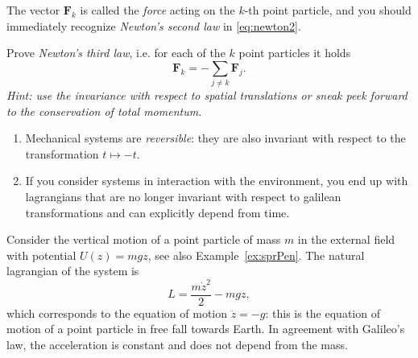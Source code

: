 \documentclass[english,fontsize=11pt,paper=a5,oneside]{scrbook}
\theoremstyle{definition}
\newenvironment{remark}
  {\pushQED{\qed}\renewcommand{\qedsymbol}{$\lozenge$}\remarkx}
  {\popQED\endremarkx}
\newenvironment{example}
  {\pushQED{\qed}\renewcommand{\qedsymbol}{$\lozenge$}\examplex}
  {\popQED\endexamplex}
\newenvironment{exercise}
  {\pushQED{\qed}\renewcommand{\qedsymbol}{$\maltese$}\exercisex}
  {\popQED\endexercisex}
\begin{document}
The vector $\bm{F}_k$ is called the \emph{force} acting on the $k$-th point particle, and you should immediately recognize \emph{Newton's second law} in \eqref{eq:newton2}.

\begin{exercise}\label{ex:N3l1}
    Prove \emph{Newton's third law}, i.e. for each of the $k$ point particles it holds
    \begin{equation}
        \bm{F}_k = -\sum_{j\neq k} \bm{F}_j.
    \end{equation}
    \textit{Hint: use the invariance with respect to spatial translations or sneak peek forward to the conservation of total momentum.}
\end{exercise}

\begin{remark}
\begin{enumerate}
    \item Mechanical systems are \emph{reversible}: they are also invariant with respect to the transformation $t\mapsto -t$.
    \item If you consider systems in interaction with the environment, you end up with lagrangians that are no longer invariant with respect to galilean transformations and can explicitly depend from time.
\end{enumerate}
\end{remark}

\begin{example}
    Consider the vertical motion of a point particle of mass $m$ in the external field with potential $U(z) = m g z$, see also Example~\ref{ex:sprPen}. The natural lagrangian of the system is
    \begin{equation}
        L = \frac{m\dot z^2}2 - mgz,
    \end{equation}
    which corresponds to the equation of motion $\ddot z = -g$: this is the equation of motion of a point particle in free fall towards Earth. In agreement with Galileo's law, the acceleration is constant and does not depend from the mass.
    
\end{example}
\end{document}
